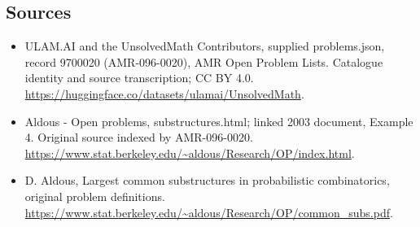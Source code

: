 \documentclass[11pt,a4paper]{article}
\begin{document}
\subsection{Sources}
\begin{itemize}
\item[S1] ULAM.AI and the UnsolvedMath Contributors, supplied problems.json, record 9700020 (AMR-096-0020), AMR Open Problem Lists. Catalogue identity and source transcription; CC BY 4.0.
\url{https://huggingface.co/datasets/ulamai/UnsolvedMath}.
\item[S2] Aldous - Open problems, substructures.html; linked 2003 document, Example 4. Original source indexed by AMR-096-0020.
\url{https://www.stat.berkeley.edu/~aldous/Research/OP/index.html}.
\item[S3] D. Aldous, Largest common substructures in probabilistic combinatorics, original problem definitions.
\url{https://www.stat.berkeley.edu/~aldous/Research/OP/common_subs.pdf}.
\end{itemize}
\end{document}
